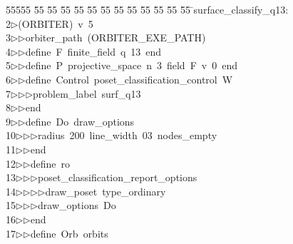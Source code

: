 %
%
\begin{tabbing}
55555 \= 55 \= 55 \= 55 \= 55 \= 55 \= 55 \= 55 \= 55 \= 55 \= 55 \= 55 \= 55 \= \>surface\_classify\_q13:\\[0pt]
2\>$\triangleright$\>(ORBITER)\ v\ 5\ \\[0pt]
3\>$\triangleright$\>$\triangleright$\>orbiter\_path\ (ORBITER\_EXE\_PATH)\ \\[0pt]
4\>$\triangleright$\>$\triangleright$\>define\ F\ finite\_field\ q\ 13\ end\ \\[0pt]
5\>$\triangleright$\>$\triangleright$\>define\ P\ projective\_space\ n\ 3\ field\ F\ v\ 0\ end\ \\[0pt]
6\>$\triangleright$\>$\triangleright$\>define\ Control\ poset\_classification\_control\ W\ \\[0pt]
7\>$\triangleright$\>$\triangleright$\>$\triangleright$\>problem\_label\ surf\_q13\ \\[0pt]
8\>$\triangleright$\>$\triangleright$\>end\ \\[0pt]
9\>$\triangleright$\>$\triangleright$\>define\ Do\ draw\_options\ \\[0pt]
10\>$\triangleright$\>$\triangleright$\>$\triangleright$\>radius\ 200\ line\_width\ 03\ nodes\_empty\ \\[0pt]
11\>$\triangleright$\>$\triangleright$\>end\ \\[0pt]
12\>$\triangleright$\>$\triangleright$\>define\ ro\ \\[0pt]
13\>$\triangleright$\>$\triangleright$\>$\triangleright$\>poset\_classification\_report\_options\ \\[0pt]
14\>$\triangleright$\>$\triangleright$\>$\triangleright$\>$\triangleright$\>draw\_poset\ type\_ordinary\ \\[0pt]
15\>$\triangleright$\>$\triangleright$\>$\triangleright$\>draw\_options\ Do\ \\[0pt]
16\>$\triangleright$\>$\triangleright$\>end\ \\[0pt]
17\>$\triangleright$\>$\triangleright$\>define\ Orb\ orbits\ \\[0pt]

\end{tabbing}
